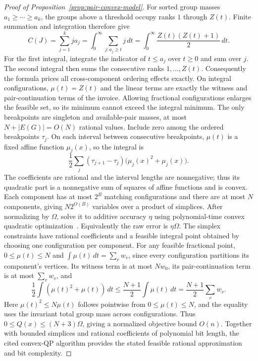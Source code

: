 \begin{proof}[Proof of Proposition~\ref{prop:pair-convex-model}]
For sorted group masses $a_1\ge\cdots\ge a_k$,
the groups above a threshold occupy ranks $1$ through $Z(t)$.
Finite summation and integration therefore give
\[
 C(J)=\sum_{j=1}^k j a_j
     =\int_0^\infty\sum_{j:a_j\ge t}j\,dt
     =\int_0^\infty\frac{Z(t)(Z(t)+1)}2\,dt.
\]
For the first integral, integrate the indicator of $t\le a_j$
over $t\ge0$ and sum over $j$. The second integral then sums the
consecutive ranks $1,\ldots,Z(t)$. Consequently the formula prices
all cross-component ordering effects exactly.
On integral configurations, $\mu(t)=Z(t)$ and the linear
terms are exactly the witness and pair-continuation terms of the
invoice. Allowing fractional configurations enlarges the feasible
set, so its minimum cannot exceed the integral minimum.
The only breakpoints are singleton and available-pair masses, at most
$N+|E(G)|=O(N)$ rational values. Include zero among the ordered
breakpoints $\tau_j$. On each interval between consecutive breakpoints,
$\mu(t)$ is a fixed affine function $\mu_j(x)$, so the integral is
\[
 \frac12\sum_j(\tau_{j+1}-\tau_j)
                 \bigl(\mu_j(x)^2+\mu_j(x)\bigr).
\]
The coefficients are rational and the interval lengths are nonnegative;
thus its quadratic part is a nonnegative sum of squares of affine
functions and is convex. Each component has at most $2^B$ matching
configurations and there are at most $N$ components, giving
$N2^{O(B)}$ variables over a product of simplices. After normalizing by $\Omega$, solve it to additive
accuracy $\eta$ using polynomial-time convex quadratic
optimization~\cite{nestnem1994}. Equivalently the raw error is $\eta\Omega$. The simplex
constraints have rational coefficients and a feasible integral point
obtained by choosing one configuration per component.
For any feasible fractional point, $0\le\mu(t)\le N$ and
$\int\mu(t)\,dt=\sum_vw_v$, since every configuration partitions
its component's vertices. Its witness term is at most $Nw_0$,
its pair-continuation term is at most $\sum_vw_v$, and
\[
 \frac12\int(\mu(t)^2+\mu(t))\,dt
 \le\frac{N+1}{2}\int\mu(t)\,dt
 =\frac{N+1}{2}\sum_vw_v.
\]
Here $\mu(t)^2\le N\mu(t)$ follows pointwise from
$0\le\mu(t)\le N$, and the equality uses the invariant total group
mass across configurations.
Thus $0\le Q(x)\le(N+3)\Omega$, giving a normalized objective
bound $O(n)$. Together with bounded simplices and rational
coefficients of polynomial bit length, the cited convex-QP algorithm
provides the stated feasible rational approximation and bit complexity.

\end{proof}


